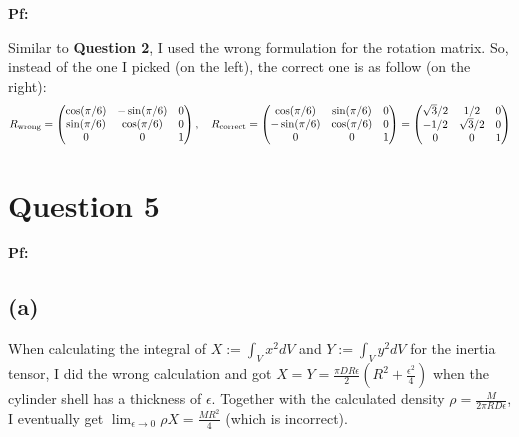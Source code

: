 \documentclass{article}
\begin{document}
\textbf{Pf:}

Similar to \textbf{Question 2}, I used the wrong formulation for the rotation matrix. So, instead of the one I picked (on the left), the correct one is as follow (on the right):
\begin{align}
    R_\textmd{wrong}=\begin{pmatrix}
        \cos(\pi/6)&-\sin(\pi/6)&0\\
        \sin(\pi/6)&\cos(\pi/6)&0\\
        0&0&1
    \end{pmatrix},\quad R_\textmd{correct} = \begin{pmatrix}
        \cos(\pi/6)&\sin(\pi/6)&0\\
        -\sin(\pi/6)&\cos(\pi/6)&0\\
        0&0&1
    \end{pmatrix} = \begin{pmatrix}
        \sqrt{3}/2 & 1/2 & 0\\
        -1/2 & \sqrt{3}/2 & 0\\
        0&0&1
    \end{pmatrix}
\end{align}

\break

\section*{Question 5}

\textbf{Pf:}

\subsection*{(a)}
When calculating the integral of $X := \int_V x^2 dV$ and $Y:=\int_V y^2 dV$ for the inertia tensor, I did the wrong calculation and got $X=Y=\frac{\pi DR\epsilon}{2}\left(R^2+\frac{\epsilon^2}{4}\right)$ when the cylinder shell has a thickness of $\epsilon$. Together with the calculated density $\rho=\frac{M}{2\pi RD\epsilon}$, I eventually get $\lim_{\epsilon\rightarrow 0}\rho X = \frac{MR^2}{4}$ (which is incorrect).
\end{document}
